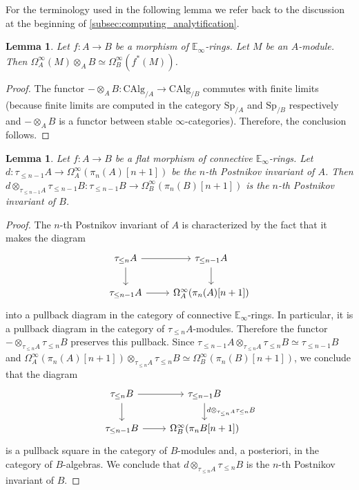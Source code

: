 \documentclass[12pt,a4paper,reqno]{amsart}
\theoremstyle{plain}
\newtheorem{lem}[thm]{Lemma}
\theoremstyle{definition}
\theoremstyle{remark}
\numberwithin{equation}{section}
\begin{document}
For the terminology used in the following lemma we refer back to the discussion at the beginning of \cref{subsec:computing_analytification}.

\begin{lem}
	Let $f \colon A \to B$ be a morphism of $\mathbb E_\infty$-rings.
	Let $M$ be an $A$-module.
	Then $\Omega^\infty_A(M) \otimes_A B \simeq \Omega^\infty_B(f^*(M))$.
\end{lem}

\begin{proof}
	The functor $- \otimes_A B \colon \mathrm{CAlg}_{/A} \to \mathrm{CAlg}_{/B}$ commutes with finite limits (because finite limits are computed in the category $\mathrm{Sp}_{/A}$ and $\mathrm{Sp}_{/B}$ respectively and $- \otimes_A B$ is a functor between stable $\infty$-categories).
	Therefore, the conclusion follows.
\end{proof}

\begin{lem} \label{lem:flat_base_change_Postnikov_invariant}
	Let $f \colon A \to B$ be a flat morphism of connective $\mathbb E_\infty$-rings.
	Let $d \colon \tau_{\le n - 1} A \to \Omega^\infty_A(\pi_n(A)[n+1])$ be the $n$-th Postnikov invariant of $A$.
	Then $d \otimes_{\tau_{\le n - 1} A} \tau_{\le n - 1} B \colon \tau_{\le n - 1} B \to \Omega^\infty_B(\pi_n(B)[n+1])$ is the $n$-th Postnikov invariant of $B$.
\end{lem}

\begin{proof}
	The $n$-th Postnikov invariant of $A$ is characterized by the fact that it makes the diagram
	\[ \begin{tikzcd}
	\tau_{\le n} A \arrow{r} \arrow{d} & \tau_{\le n-1} A \arrow{d} \\
	\tau_{\le n - 1} A \arrow{r} & \Omega^\infty_A(\pi_n(A)[n+1])
	\end{tikzcd} \]
	into a pullback diagram in the category of connective $\mathbb E_\infty$-rings.
	In particular, it is a pullback diagram in the category of $\tau_{\le n} A$-modules.
	Therefore the functor $- \otimes_{\tau_{\le n} A} \tau_{\le n} B$ preserves this pullback.
	Since $\tau_{\le n - 1} A \otimes_{\tau_{\le n} A} \tau_{\le n} B \simeq \tau_{\le n - 1} B$ and $\Omega^\infty_A(\pi_n(A)[n+1]) \otimes_{\tau_{\le n} A} \tau_{\le n} B \simeq \Omega^\infty_B(\pi_n(B)[n+1])$, we conclude that the diagram
	\[ \begin{tikzcd}
	\tau_{\le n} B \arrow{r} \arrow{d} & \tau_{\le n - 1} B \arrow{d}{d \otimes_{\tau_{\le n} A} \tau_{\le n} B} \\
	\tau_{\le n - 1} B \arrow{r} & \Omega^\infty_B(\pi_n B[n+1])
	\end{tikzcd} \]
	is a pullback square in the category of $B$-modules and, a posteriori, in the category of $B$-algebras.
	We conclude that $d \otimes_{\tau_{\le n} A} \tau_{\le n} B$ is the $n$-th Postnikov invariant of $B$.
\end{proof}
\end{document}
